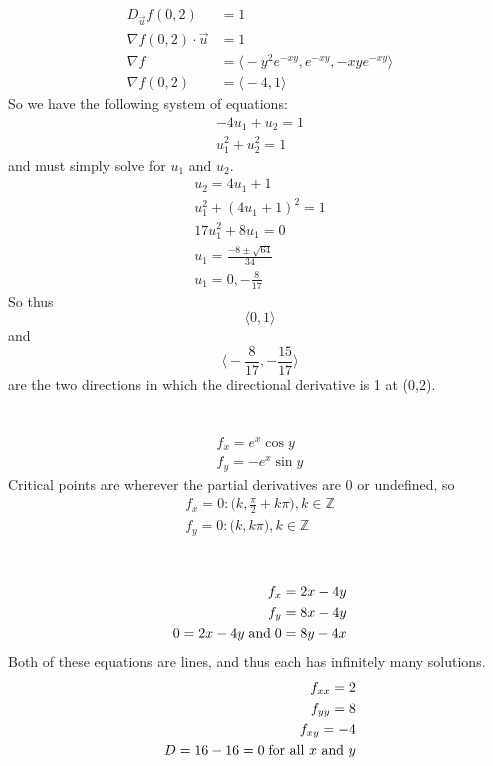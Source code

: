 \documentclass{article}
\begin{document}
\section{} %
\begin{align*}
	D_{\vec{u}}f(0,2)&=1\\
	\nabla{f}(0,2)\cdot\vec{u}&=1\\
	\nabla{f}&=\big\langle-y^2e^{-xy},e^{-xy},-xye^{-xy}\big\rangle\\
	\nabla{f}(0,2)&=\big\langle-4,1\big\rangle
\end{align*}
So we have the following system of equations:
\begin{align*}
	-4u_1+u_2=1\\
	u_1^2+u_2^2=1
\end{align*}
and must simply solve for $u_1$ and $u_2$.
\begin{align*}
	u_2=4u_1+1\\
	u_1^2+(4u_1+1)^2=1\\
	17u_1^2+8u_1=0\\
	u_1=\frac{-8\pm\sqrt{64}}{34}\\
	u_1=0,-\frac{8}{17}
\end{align*}
So thus
\[\big\langle0,1\big\rangle\]
and
\[\big\langle-\frac{8}{17},-\frac{15}{17}\big\rangle\]
are the two directions in which the directional derivative is 1 at (0,2).
\section{} %
\begin{align*}
	f_x=e^x\cos{y}\\
	f_y=-e^x\sin{y}
\end{align*}
Critical points are wherever the partial derivatives are 0 or undefined, so
\begin{align*}
	f_x=0:\bigg(k,\frac{\pi}{2}+k\pi\bigg),k\in\mathbb{Z}\\
	f_y=0:\bigg(k,k\pi\bigg),k\in\mathbb{Z}\\
\end{align*}
\section{} %
\begin{align*}
	f_x=2x-4y\\
	f_y=8x-4y\\
	0=2x-4y\text{\;and\;}0=8y-4x
\end{align*}
Both of these equations are lines, and thus each has infinitely many solutions.
\begin{align*}
	f_{xx}=2\\
	f_{yy}=8\\
	f_{xy}=-4\\
	D=16-16=0\text{\;for all $x$ and $y$}\\
\end{align*}
\end{document}
